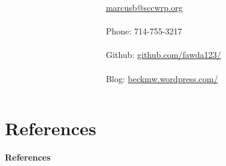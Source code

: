 \documentclass[serif]{beamer}\usepackage[]{graphicx}\usepackage[]{color}
\begin{document}
\begin{frame}
\begin{columns}
\begin{column}{0.5\textwidth}
\end{column}
\begin{column}{0.5\textwidth}
\scriptsize
\href{mailto:marcusb@sccwrp.org}{marcusb@sccwrp.org} \\~\\
Phone: 714-755-3217 \\~\\
Github: \href{https://github.com/fawda123/}{github.com/fawda123/} \\~\\
Blog: \href{http://beckmw.wordpress.com/}{beckmw.wordpress.com/}
\end{column}
\end{columns}
\vspace{0.2in}
\end{frame}

\section{References}
\begin{frame}[t,shrink]{\textbf{References}}
\tiny
{}


\end{frame}
\end{document}
